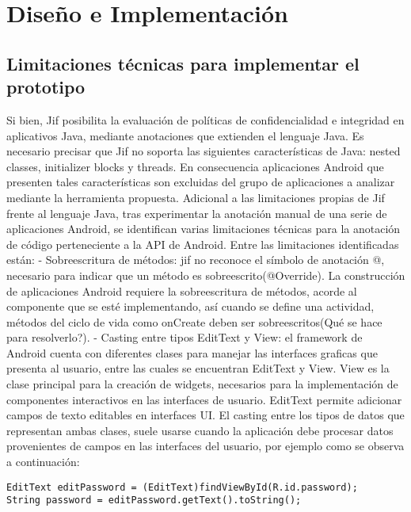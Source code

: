 \label{ch:desing}
\chapter{Diseño e Implementación}

\section{Limitaciones técnicas para implementar el prototipo}
Si bien, Jif posibilita la evaluación de políticas de confidencialidad e
integridad en aplicativos Java, mediante anotaciones que extienden el lenguaje
Java. Es necesario precisar que Jif no soporta las siguientes características de
Java: nested classes, initializer blocks y threads.\newline 
En consecuencia aplicaciones Android que presenten tales características son
excluidas del grupo de aplicaciones a analizar mediante la herramienta
propuesta.\newline
Adicional a las limitaciones propias de Jif frente al lenguaje Java, tras
experimentar la anotación manual de una serie de aplicaciones Android, se
identifican varias limitaciones técnicas para la anotación de código
perteneciente a la API de Android. Entre las limitaciones identificadas
están:\newline 
- Sobreescritura de métodos: jif no reconoce el símbolo de anotación @,
necesario para indicar que un método es sobreescrito(@Override). La construcción
de aplicaciones Android requiere la sobreescritura de métodos, acorde al
componente que se esté implementando, así cuando se define una actividad,
métodos del ciclo de vida como onCreate deben ser sobreescritos(Qué se hace para
resolverlo?).\newline 
- Casting entre tipos EditText y View: el framework de Android cuenta con
diferentes clases para manejar las interfaces graficas que presenta al usuario,
entre las cuales se encuentran EditText y View. View es la clase principal para
la creación de widgets, necesarios para la implementación de componentes
interactivos en las interfaces de usuario. EditText permite adicionar campos de
texto editables en interfaces UI. El casting entre los tipos de datos que
representan ambas clases, suele usarse cuando la aplicación debe procesar datos
provenientes de campos en las interfaces del usuario, por ejemplo como se
observa a continuación:
\begin{lstlisting}
EditText editPassword = (EditText)findViewById(R.id.password);
String password = editPassword.getText().toString();
\end{lstlisting}
